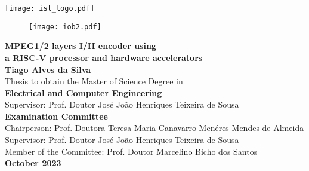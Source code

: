 \documentclass[10pt]{esda}
\title{}
\author{}
\date{}
\begin{document}
\texttt{[image: ist\_logo.pdf]}

\thispagestyle{empty}

\vspace{2.5cm}

\begin{figure}[H]
  \centering
  \texttt{[image: iob2.pdf]}
\end{figure}


\begin{onehalfspace}

\begin{center}
\begin{Large}
  {\bf \Large {MPEG1/2 layers I/II encoder using \\ a RISC-V processor and hardware accelerators}}\\
  \vspace{1cm}
  {\bf \large Tiago Alves da Silva}\\
  \vspace{1cm}
  \normalsize {Thesis to obtain the Master of Science Degree in}\\
  \vspace{0.5cm}
  {\bf \Large {Electrical and Computer Engineering}}\\
  \vspace{1cm}
  \normalsize {Supervisor: Prof. Doutor José João Henriques Teixeira de Sousa}\\
  \vspace{1cm}
  {\bf \large Examination Committee}\\
  \vspace{1cm}
  \normalsize {Chairperson: Prof. Doutora Teresa Maria Canavarro Menéres Mendes de Almeida}\\
  \normalsize {Supervisor: Prof. Doutor José João Henriques Teixeira de Sousa}\\
  \normalsize {Member of the Committee: Prof. Doutor Marcelino Bicho dos Santos}\\

  \vspace{1cm}
  {\bf \large October 2023 }
\end{Large}
\end{center}

\end{onehalfspace}
\end{document}
